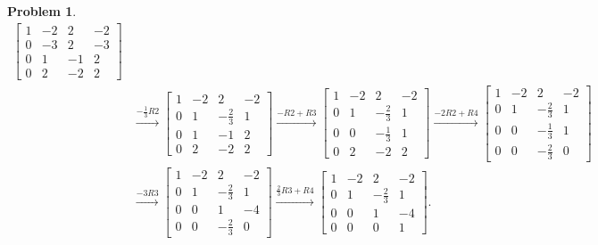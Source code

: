 \documentclass{article}
\theoremstyle{pprop}
\newtheorem{problem}{Problem}[section]
\begin{document}
\begin{problem}
\begin{align*}
\begin{bmatrix}
1 & -2 & 2 & -2 \\
0 & -3 & 2 & -3 \\
0 & 1 & -1 & 2 \\
0 & 2 & -2 & 2
\end{bmatrix} \\
&\xrightarrow{-\frac13R2}
\begin{bmatrix}
1 & -2 & 2 & -2 \\
0 & 1 & -\frac23 & 1 \\
0 & 1 & -1 & 2 \\
0 & 2 & -2 & 2
\end{bmatrix} 
\xrightarrow{-R2+R3}
\begin{bmatrix}
1 & -2 & 2 & -2 \\
0 & 1 & -\frac23 & 1 \\
0 & 0 & -\frac13 & 1 \\
0 & 2 & -2 & 2
\end{bmatrix} 
\xrightarrow{-2R2+R4}
\begin{bmatrix}
1 & -2 & 2 & -2 \\
0 & 1 & -\frac23 & 1 \\
0 & 0 & -\frac13 & 1 \\
0 & 0 & -\frac23 & 0
\end{bmatrix}\\
& \xrightarrow{-3R3}
\begin{bmatrix}
1 & -2 & 2 & -2 \\
0 & 1 & -\frac23 & 1 \\
0 & 0 & 1 & -4 \\
0 & 0 & -\frac23 & 0
\end{bmatrix}
\xrightarrow{\frac23R3+R4}
\begin{bmatrix}
1 & -2 & 2 & -2 \\
0 & 1 & -\frac23 & 1 \\
0 & 0 & 1 & -4 \\
0 & 0 & 0 & 1
\end{bmatrix}.
\end{align*}


\end{problem}
\end{document}
